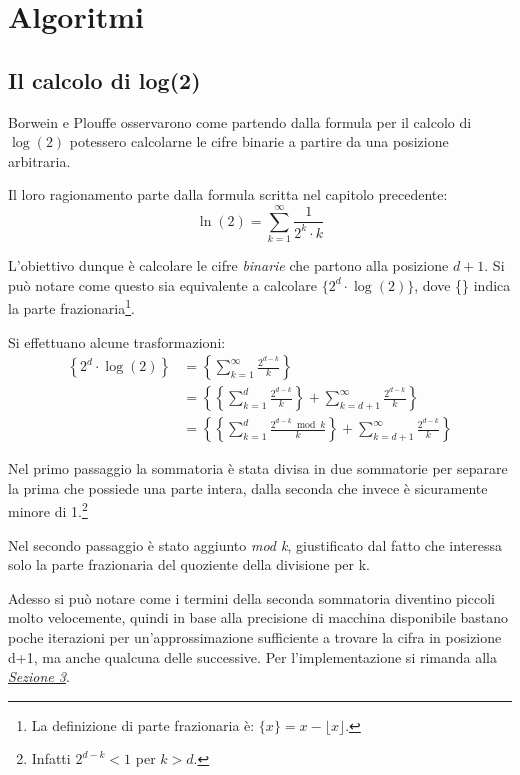 \section{Algoritmi}

\subsection{Il calcolo di log(2)}
Borwein e Plouffe osservarono come partendo dalla formula per il calcolo di $\log(2)$ potessero calcolarne le cifre binarie a partire da una posizione arbitraria.

\noindent Il loro ragionamento parte dalla formula scritta nel capitolo precedente:
$$\ln(2) = \sum\limits_{k=1}^{\infty} \frac{1}{2^k \cdot k}$$

\noindent L'obiettivo dunque è calcolare le cifre \textit{binarie} che partono alla posizione $d+1$. Si può notare come questo sia equivalente a calcolare $\{2^d \cdot \log(2)\}$, dove \{\} indica la parte frazionaria\footnote{La definizione di parte frazionaria è: $\{x\} = x - \lfloor x \rfloor$.}.

Si effettuano alcune trasformazioni:
\begin{equation*}
\begin{split}
\left\{2^d \cdot \log(2)\right\}
& = \left\{ \sum\limits_{k=1}^{\infty} \frac{2^{d-k}}{k} \right\} \\
& = \left\{ \left\{ \sum\limits_{k=1}^{d} \frac{2^{d-k}}{k} \right\} + \sum\limits_{k=d+1}^{\infty} \frac{2^{d-k}}{k} \right\} \\
& = \left\{ \left\{ \sum\limits_{k=1}^{d} \frac{2^{d-k}\bmod k}{k} \right\} + \sum\limits_{k=d+1}^{\infty} \frac{2^{d-k}}{k} \right\}
\end{split}
\end{equation*}

Nel primo passaggio la sommatoria è stata divisa in due sommatorie per separare la prima che possiede una parte intera, dalla seconda che invece è sicuramente minore di 1.\footnote{Infatti $2^{d-k} < 1$ per $k > d$.}

Nel secondo passaggio è stato aggiunto \textit{mod k}, giustificato dal fatto che interessa solo la parte frazionaria del quoziente della divisione per k.

Adesso si può notare come i termini della seconda sommatoria diventino piccoli molto velocemente, quindi in base alla precisione di macchina disponibile bastano poche iterazioni per un'approssimazione sufficiente a trovare la cifra in posizione d+1, ma anche qualcuna delle successive.
\bigbreak \noindent
Per l'implementazione si rimanda alla \hyperref[sec:impl]{\textit{Sezione 3}}.

